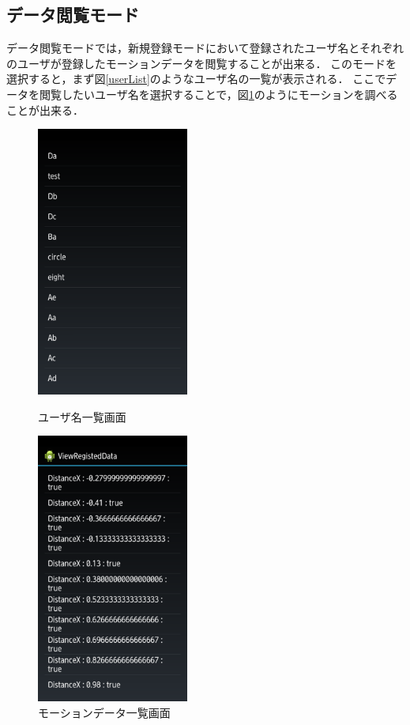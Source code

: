 \documentclass[11pt]{jreport}
\begin{document}
        \subsection{データ閲覧モード}
        データ閲覧モードでは，新規登録モードにおいて登録されたユーザ名とそれぞれのユーザが登録したモーションデータを閲覧することが出来る．
        このモードを選択すると，まず図\ref{userList}のようなユーザ名の一覧が表示される．
        ここでデータを閲覧したいユーザ名を選択することで，図\ref{dataList}のようにモーションを調べることが出来る．

        \begin{figure}[tbp]
            \begin{minipage}{0.5\hsize}
                \begin{center}
                    \includegraphics[width=5cm, bb=0 0 540 960]{UserList.pdf}
                \end{center}
                \caption{ユーザ名一覧画面}
                \label{userList}
            \end{minipage}
            \begin{minipage}{0.5\hsize}
                \begin{center}
                    \includegraphics[width=5cm, bb=0 0 540 960]{DataList.pdf}
                \end{center}
                \caption{モーションデータ一覧画面}
                \label{dataList}
            \end{minipage}
        \end{figure}
\end{document}
